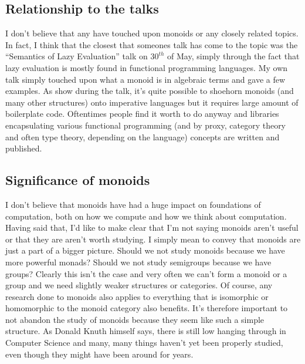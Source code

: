 \documentclass{acm_proc_article-sp}
\begin{document}
\subsection{Relationship to the talks}
I don't believe that any have touched upon monoids or any closely
related topics. In fact, I think that the closest that someones talk
has come to the topic was the ``Semantics of Lazy Evaluation'' talk on
$30^{th}$ of May, simply through the fact that lazy evaluation is
mostly found in functional programming languages. My own talk simply
touched upon what a monoid is in algebraic terms and gave a few
examples. As show during the talk, it's quite possible to shoehorn
monoids (and many other structures) onto imperative languages but it
requires large amount of boilerplate code. Oftentimes people find it
worth to do anyway and libraries encapsulating various functional
programming (and by proxy, category theory and often type theory,
depending on the language) concepts are written and
published\cite{java:functional}.

\subsection{Significance of monoids}
I don't believe that monoids have had a huge impact on foundations of
computation, both on how we compute and how we think about
computation. Having said that, I'd like to make clear that I'm not
saying monoids aren't useful or that they are aren't worth studying. I
simply mean to convey that monoids are just a part of a bigger
picture. Should we not study monoids because we have more powerful
monads? Should we not study semigroups because we have groups? Clearly
this isn't the case and very often we can't form a monoid or a group
and we need slightly weaker structures or categories. Of course, any
research done to monoids also applies to everything that is isomorphic
or homomorphic to the monoid category also benefits. It's therefore
important to not abandon the study of monoids because they seem like
such a simple structure. As Donald Knuth himself says, there is still
low hanging through in Computer Science and many, many things haven't
yet been properly studied, even though they might have been around for
years\cite{knuth:google}.



\balancecolumns
\end{document}
